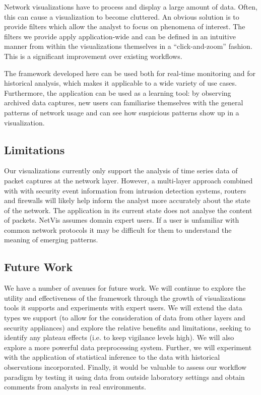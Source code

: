 Network visualizations have to process and display a large amount of data. Often, this can cause a
visualization to become cluttered. An obvious solution is to provide filters which allow the analyst
to focus on phenomena of interest. The filters we provide apply application-wide and can be defined
in an intuitive manner from within the visualizations themselves in a ``click-and-zoom'' fashion.
This is a significant improvement over existing workflows.

The framework developed here can be used both for real-time monitoring and for historical analysis,
which makes it applicable to a wide variety of use cases. Furthermore, the application can be used
as a learning tool: by observing archived data captures, new users can familiarise themselves with
the general patterns of network usage and can see how suspicious patterns show up in a
visualization.

\subsection{Limitations}
Our visualizations currently only support the analysis of time series data of packet captures at the network layer. However, a multi-layer approach combined with with security event information from intrusion detection systems, routers and firewalls will likely help inform the analyst more accurately about the state of the network. The application in its current state does not analyse the content of packets. NetVis assumes domain expert users. If a user is unfamiliar with common network protocols it may be difficult for them to understand the meaning of emerging patterns. 

\subsection{Future Work}
%
We have a number of avenues for future work. We will continue to explore the utility and
effectiveness of the framework through the growth of visualizations tools it supports and
experiments with expert users. We will extend the data types we support (to allow for the
consideration of data from other layers and security appliances) and explore the relative benefits
and limitations, seeking to identify any plateau effects (i.e. to keep vigilance levels high). We will also explore a more powerful data preprocessing system. Further, we will experiment with the application of statistical inference to the data with historical observations incorporated. Finally, it would be valuable to assess our workflow paradigm by testing it using data from outside laboratory settings and obtain comments from analysts in real environments.

